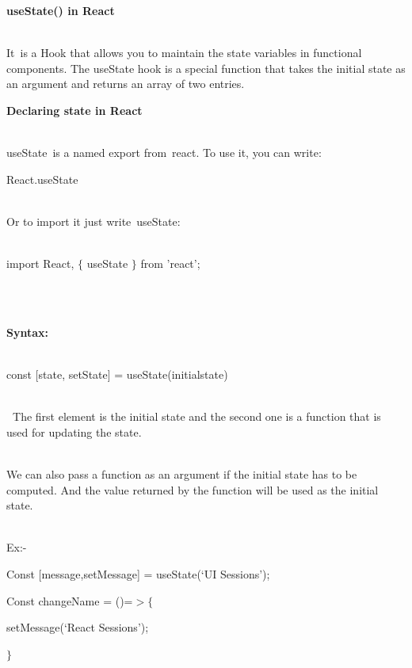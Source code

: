 \documentclass{article}
\begin{document}
\noindent \textbf{useState() in React}

\noindent 

\noindent \\
It~is a Hook that allows you to maintain the state variables in functional components.  The useState hook is a special function that takes the initial state as an argument and returns an array of two entries.

\noindent 

\noindent 

\noindent \textbf{Declaring state in React}

\noindent \\
useState~is a named export from~react. To use it, you can write:

\noindent React.useState

\noindent \\
Or to import it just write~useState:

\noindent \\
import React, $\mathrm{\{}$ useState $\mathrm{\}}$ from 'react';

\noindent ~

\noindent 

\noindent 

\noindent \\
\textbf{Syntax:}

\noindent \\
const [state, setState] = useState(initialstate)

\noindent 

\noindent \\
\textbf{~}The first element is the initial state and the second one is a function that is used for updating the state.

\noindent 

\noindent \\
We can also pass a function as an argument if the initial state has to be computed. And the value returned by the function will be used as the initial state.

\noindent \\
Ex:-

\noindent Const [message,setMessage] = useState(`UI Sessions');

\noindent 

\noindent Const changeName = ()=$\mathrm{>}$$\mathrm{\{}$

\noindent    setMessage(`React Sessions');

\noindent $\mathrm{\}}$
\end{document}

